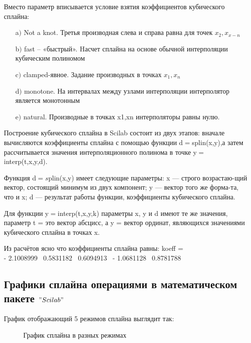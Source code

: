 \documentclass[russian,utf8,nocolumnxxxi,nocolumnxxxii]{eskdtext}
\begin{document}
Вместо параметр вписывается условие взятия коэффициентов кубического сплайна:
\begin{enumerate}
  \item[a$)$] Not \makebox[0,3cm]{\hrulefill} a             \makebox[0,3cm]{\hrulefill} knot. Третья производная слева и справа равна для точек $x_2,x_{x-n}$
  \item[b$)$] fast – «быстрый». Hасчет сплайна на основе обычной интерполяции кубическим полиномом
  \item[c$)$] clamped-явное. Задание производных в точках $x_1,x_n$
  \item[d$)$] monotone. На интервалах между узлами интерполяции интерполятор является монотонным
  \item[e$)$] natural. Производные в точках x1,xn интерполяторы равны нулю.
\end{enumerate}

Построение кубического сплайна в Scilab состоит из двух этапов: вначале вычисляются коэффициенты сплайна с помощью функции d$=$splin(x,y),а затем рассчитывается значения интерполяционного полинома в точке y$=$interp(t,x,y,d).

Функция d$=s$plin(x,y) имеет следующие параметры: x — строго возрастаю-щий вектор, состоящий минимум из двух компонент; y — вектор того же форма-та, что и x; d — результат работы функции, коэффициенты кубического сплайна.

Для функции y$=$interp(t,x,y,k) параметры x, y и d имеют те же значения,
параметр t = это вектор абсцисс, а y = вектор ординат, являющихся значениями
кубического сплайна в точках x.

Из расчётов ясно что коэффициенты сплайна равны:
koeff  =\\

  - 2.1008999 \   0.5831182  \  0.6094913 \ - 1.0681128 \   0.8781788 \\
  \newpage
\subsection{Графики сплайна операциями в математическом пакете $"Scilab"$}
    

График отображающий 5 режимов сплайна выглядит так:
\begin{figure}[h!]
\caption*{График сплайна в разных режимах}
\end{figure}

\newpage
\end{document}
